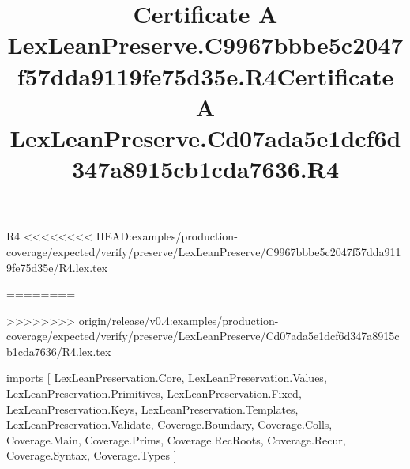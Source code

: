 \begin{lexlean}{R4}
<<<<<<<< HEAD:examples/production-coverage/expected/verify/preserve/LexLeanPreserve/C9967bbbe5c2047f57dda9119fe75d35e/R4.lex.tex
\title{Certificate A LexLeanPreserve.C9967bbbe5c2047f57dda9119fe75d35e.R4}
========
\title{Certificate A LexLeanPreserve.Cd07ada5e1dcf6d347a8915cb1cda7636.R4}
>>>>>>>> origin/release/v0.4:examples/production-coverage/expected/verify/preserve/LexLeanPreserve/Cd07ada5e1dcf6d347a8915cb1cda7636/R4.lex.tex
\begin{coremodule}
imports [
  LexLeanPreservation.Core,
  LexLeanPreservation.Values,
  LexLeanPreservation.Primitives,
  LexLeanPreservation.Fixed,
  LexLeanPreservation.Keys,
  LexLeanPreservation.Templates,
  LexLeanPreservation.Validate,
  Coverage.Boundary,
  Coverage.Colls,
  Coverage.Main,
  Coverage.Prims,
  Coverage.RecRoots,
  Coverage.Recur,
  Coverage.Syntax,
  Coverage.Types
]


\end{coremodule}
\end{lexlean}
